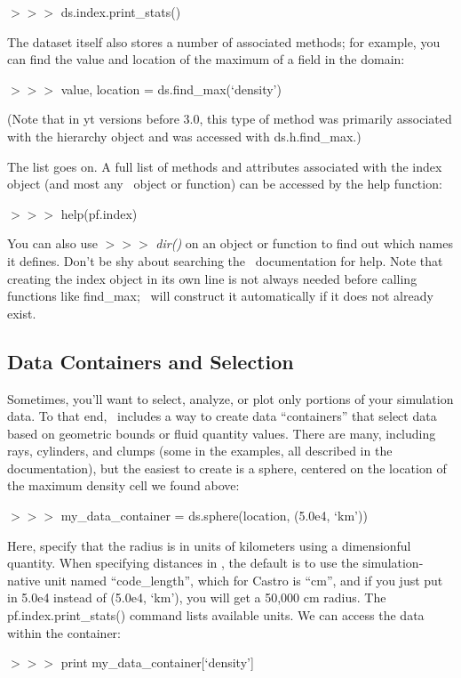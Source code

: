 {\scriptsize$>>>$} ds.index.print\_stats()

The dataset itself also stores a number of associated methods; for example,
you can find the value and location of the maximum of a field in the domain:

{\scriptsize$>>>$} value, location = ds.find\_max(`density')

(Note that in yt versions before 3.0, this type of method was primarily
associated with the hierarchy object and was accessed with ds.h.find\_max.)

The list goes on. A full list of methods and attributes associated
with the index object (and most any \yt\ object or function) can be
accessed by the help function:

{\scriptsize$>>>$} help(pf.index)

You can also use {\scriptsize$>>>$} {\it dir()} on an object or
function to find out which names it defines. Don't be shy about
searching the \yt\ documentation for help. Note that creating the
index object in its own line is not always needed before calling
functions like find\_max; \yt\ will construct it automatically if it
does not already exist.

\subsection{Data Containers and Selection}

Sometimes, you'll want to select, analyze, or plot only portions of
your simulation data. To that end, \yt\ includes a way to create data
``containers'' that select data based on geometric bounds or fluid
quantity values. There are many, including rays, cylinders, and clumps
(some in the examples, all described in the documentation), but the
easiest to create is a sphere, centered on the location of the maximum
density cell we found above:

{\scriptsize$>>>$} my\_data\_container = ds.sphere(location, (5.0e4, `km'))

Here, specify that the radius is in units of kilometers using a dimensionful
quantity. When specifying distances in \yt, the default is to use the
simulation-native unit named ``code\_length'', which for Castro is ``cm'', and
if you just put in 5.0e4 instead of (5.0e4, `km'), you will get a 50,000 cm radius.
The pf.index.print\_stats() command lists available units. We can access the data
within the container:

{\scriptsize$>>>$} print my\_data\_container[`density']

